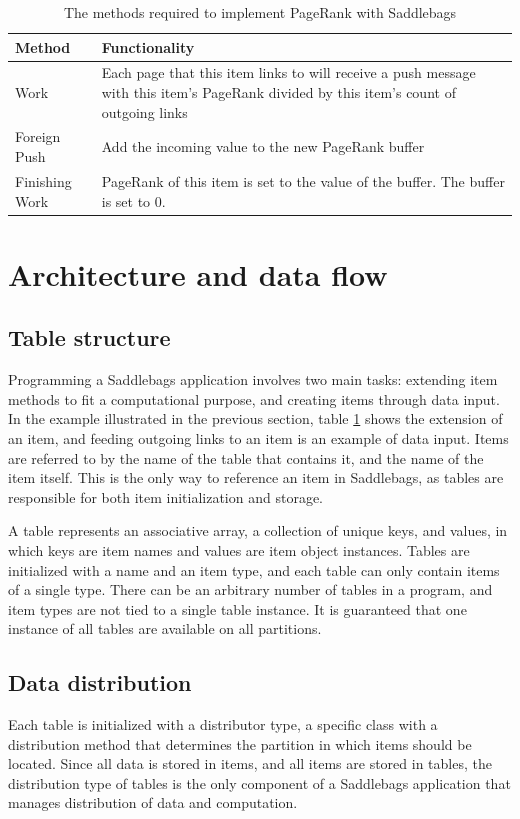 \documentclass{uit-report}
\begin{document}
\begin{table}[h]
	\setlength\arrayrulewidth{1pt}
	\renewcommand{\arraystretch}{2}
	\begin{tabular}{ | p{3cm} | p{12cm} |}
		\hline
		\textbf{Method} & \textbf{Functionality} \\ \hline
		Work & Each page that this item links to will receive a push message with this item's PageRank divided by this item's count of outgoing links \\ \hline
		Foreign Push & Add the incoming value to the new PageRank buffer \\ \hline
		Finishing Work & PageRank of this item is set to the value of the buffer. The buffer is set to 0.\\ \hline
		
	\end{tabular}
	\caption{The methods required to implement PageRank with Saddlebags}
	\label{table:pagerankevents}
\end{table}

\section{Architecture and data flow}
\subsection{Table structure}
Programming a Saddlebags application involves two main tasks: extending item methods to fit a computational purpose, and creating items through data input. In the example illustrated in the previous section, table \ref{table:pagerankevents} shows the extension of an item, and feeding outgoing links to an item is an example of data input. Items are referred to by the name of the table that contains it, and the name of the item itself. This is the only way to reference an item in Saddlebags, as tables are responsible for both item initialization and storage.

A table represents an associative array, a collection of unique keys, and values, in which keys are item names and values are item object instances.  Tables are initialized with a name and an item type, and each table can only contain items of a single type. There can be an arbitrary number of tables in a program, and item types are not tied to a single table instance. It is guaranteed that one instance of all tables are available on all partitions.




\subsection{Data distribution}
Each table is initialized with a distributor type, a specific class with a distribution method that determines the partition in which items should be located. Since all data is stored in items, and all items are stored in tables, the distribution type of tables is the only component of a Saddlebags application that manages distribution of data and computation.
\end{document}
